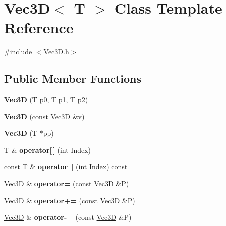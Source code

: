 \hypertarget{class_vec3_d}{
\section{Vec3D$<$ T $>$ Class Template Reference}
\label{class_vec3_d}
}


{\ttfamily \#include $<$Vec3D.h$>$}

\subsection*{Public Member Functions}
\begin{DoxyCompactItemize}
\item 
\hypertarget{class_vec3_d_ad3cce559bc84474c4adf7fbaf2fdc25f}{
{\bfseries Vec3D} (T p0, T p1, T p2)}
\label{class_vec3_d_ad3cce559bc84474c4adf7fbaf2fdc25f}

\item 
\hypertarget{class_vec3_d_a5444e42b09893d7618f61cc1681b082d}{
{\bfseries Vec3D} (const \hyperlink{class_vec3_d}{Vec3D} \&v)}
\label{class_vec3_d_a5444e42b09893d7618f61cc1681b082d}

\item 
\hypertarget{class_vec3_d_aa947cb0f4fe2f1b8c5bedd6d8a468dcd}{
{\bfseries Vec3D} (T $\ast$pp)}
\label{class_vec3_d_aa947cb0f4fe2f1b8c5bedd6d8a468dcd}

\item 
\hypertarget{class_vec3_d_afd2f2055bf7d557b5221f892c9d3327c}{
T \& {\bfseries operator\mbox{[}$\,$\mbox{]}} (int Index)}
\label{class_vec3_d_afd2f2055bf7d557b5221f892c9d3327c}

\item 
\hypertarget{class_vec3_d_a120eb3de5b65fee0bc60e9112d9b626d}{
const T \& {\bfseries operator\mbox{[}$\,$\mbox{]}} (int Index) const }
\label{class_vec3_d_a120eb3de5b65fee0bc60e9112d9b626d}

\item 
\hypertarget{class_vec3_d_affb5b03bf1784897eb8b23b606fa5140}{
\hyperlink{class_vec3_d}{Vec3D} \& {\bfseries operator=} (const \hyperlink{class_vec3_d}{Vec3D} \&P)}
\label{class_vec3_d_affb5b03bf1784897eb8b23b606fa5140}

\item 
\hypertarget{class_vec3_d_ac79f951e4c65f333cac1ea9bd85ca121}{
\hyperlink{class_vec3_d}{Vec3D} \& {\bfseries operator+=} (const \hyperlink{class_vec3_d}{Vec3D} \&P)}
\label{class_vec3_d_ac79f951e4c65f333cac1ea9bd85ca121}

\item 
\hypertarget{class_vec3_d_a1004d16ee2afd0c895bcf78fb5d9e9b6}{
\hyperlink{class_vec3_d}{Vec3D} \& {\bfseries operator-\/=} (const \hyperlink{class_vec3_d}{Vec3D} \&P)}
\label{class_vec3_d_a1004d16ee2afd0c895bcf78fb5d9e9b6}


\end{DoxyCompactItemize}
